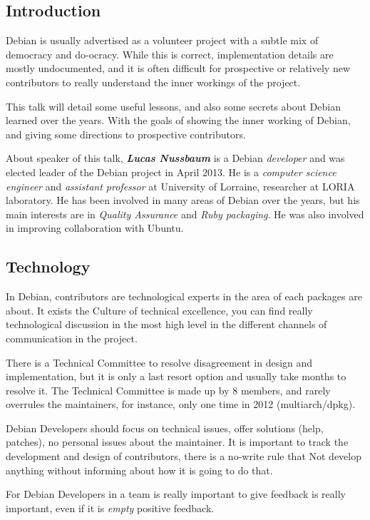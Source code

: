 \documentclass[11pt]{article}
\begin{document}
\subsection{Introduction}
Debian is usually advertised as a volunteer project with a subtle mix of democracy and do-ocracy. While this is correct, implementation details are mostly undocumented, and it is often difficult for prospective or relatively new contributors to really understand the inner workings of the project.

This talk will detail some useful lessons, and also some secrets about Debian learned over the years. With the goals of showing the inner working of Debian, and giving some directions to prospective contributors.

About speaker of this talk, \emph{\textbf{Lucas Nussbaum}} is a Debian \emph{developer} and was elected leader of the Debian project in April 2013. He is a \emph{computer science engineer} and \emph{assistant professor} at University of Lorraine, researcher at LORIA laboratory. He has been involved in many areas of Debian over the years, but his main interests are in \emph{Quality Assurance} and \emph{Ruby packaging}. He was also involved in improving collaboration with Ubuntu.

\subsection{Technology}
In Debian, contributors are technological experts in the area of each packages are about. It exists the Culture of technical excellence, you can find really technological discussion in the most high level in the different channels of communication in the project.

There is a Technical Committee to resolve disagreement in design and implementation, but it is only a last resort option and usually take months to resolve it. The Technical Committee is made up by 8 members, and rarely overrules the maintainers, for instance, only one time in 2012 (multiarch/dpkg).

Debian Developers should focus on technical issues, offer solutions (help, patches), no personal issues about the maintainer. It is important to track the development and design of contributors, there is a no-write rule that Not develop anything without informing about how it is going to do that.

For Debian Developers in a team is really important to give feedback is really important, even if it is \emph{empty} positive feedback.
\end{document}
